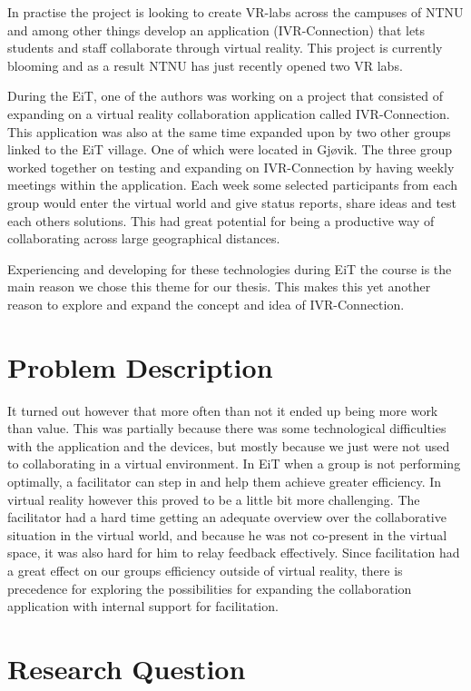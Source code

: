         In practise the project is looking to create VR-labs across the campuses of NTNU and among other things develop an application (IVR-Connection) that lets students and staff collaborate through virtual reality. This project is currently blooming \cite{4C1R-Geminin} and as a result NTNU has just recently opened two VR labs. \cite{OpenVRLab} 
        
        During the EiT, one of the authors was working on a project that consisted of expanding on a virtual reality collaboration application called IVR-Connection. This application was also at the same time expanded upon by two other groups linked to the EiT village. One of which were located in Gjøvik. The three group worked together on testing and expanding on IVR-Connection by having weekly meetings within the application. Each week some selected participants from each group would enter the virtual world and give status reports, share ideas and test each others solutions. This had great potential for being a productive way of collaborating across large geographical distances.
        
        Experiencing and developing for these technologies during EiT the course is the main reason we chose this theme for our thesis. This makes this yet another reason to explore and expand the concept and idea of IVR-Connection.
    
    \section{Problem Description}
        It turned out however that more often than not it ended up being more work than value. This was partially because there was some technological difficulties with the application and the devices, but mostly because we just were not used to collaborating in a virtual environment. In EiT when a group is not performing optimally, a facilitator can step in and help them achieve greater efficiency. In virtual reality however this proved to be a little bit more challenging. The facilitator had a hard time getting an adequate overview over the collaborative situation in the virtual world, and because he was not co-present in the virtual space, it was also hard for him to relay feedback effectively. Since facilitation had a great effect on our groups efficiency outside of virtual reality, there is precedence for exploring the possibilities for expanding the collaboration application with internal support for facilitation.
        
    \section{Research Question}
    
